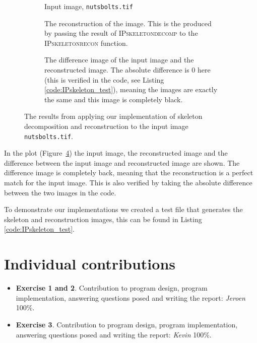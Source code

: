 \documentclass{article}
\begin{document}
\begin{figure}[H]
     \begin{subfigure}[t]{0.3\textwidth}
         \centering
         
         \caption{Input image, \texttt{nutsbolts.tif}}
         \label{fig:skeletonrecon_input}
     \end{subfigure}
     \hfill
     \begin{subfigure}[t]{0.3\textwidth}
         \centering
         
         \caption{The reconstruction of the image. This is the produced by passing the result of \textsc{IPskeletondecomp} to the \textsc{IPskeletonrecon} function.}
         \label{fig:skeleton_reconstruction}
     \end{subfigure}
     \hfill
     \begin{subfigure}[t]{0.3\textwidth}
         \centering
         
         \caption{The difference image of the input image and the reconstructed image. The absolute difference is 0 here (this is verified in the code, see  Listing \ref{code:IPskeleton_test}), meaning the images are exactly the same and this image is completely black.}
         \label{fig:skeleton_difference}
     \end{subfigure}
    \caption{The results from applying our implementation of skeleton decomposition and reconstruction to the input image \texttt{nutsbolts.tif}.}
    \label{fig:skeletonrecon}
\end{figure}

In the plot (Figure~\ref{fig:skeletonrecon}) the input image, the reconstructed image and the difference between the input image and reconstructed image are shown. The difference image is completely back, meaning that the reconstruction is a perfect match for the input image. This is also verified by taking the absolute difference between the two images in the code.

To demonstrate our implementations we created a test file that generates the skeleton and reconstruction images, this can be found in  Listing \ref{code:IPskeleton_test}.


\section*{Individual contributions}
\begin{itemize}
    \item \textbf{Exercise 1 and 2}. Contribution to program design, program implementation, answering questions posed and writing the report: \textit{Jeroen} 100\%.
    \item \textbf{Exercise 3}. Contribution to program design, program implementation, answering questions posed and writing the report: \textit{Kevin} 100\%.
\end{itemize}
\end{document}
